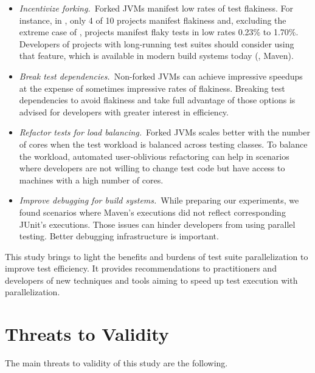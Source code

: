 \documentclass[10pt,journal,compsoc]{IEEEtran}
\begin{document}
\begin{itemize}
\item \emph{Incentivize forking.}~Forked JVMs manifest low rates of
  test flakiness.  For instance, in \emph{\ForkSeq{}}, only 4 of 10
  projects manifest flakiness and, excluding the extreme case of
  , projects manifest flaky tests in low rates 0.23\%
  to 1.70\%.  Developers of projects with long-running test suites
  should consider using that feature, which is available in modern
  build systems today (\eg{}, Maven).
\item \emph{Break test dependencies.}~Non-forked JVMs can achieve
  impressive speedups at the expense of sometimes impressive rates of
  flakiness.  Breaking test dependencies to avoid flakiness and take
  full advantage of those options is advised for developers with
  greater interest in efficiency.
\item \emph{Refactor tests for load balancing.}~Forked JVMs scales
  better with the number of cores when the test workload is balanced
  across testing classes.  To balance the workload, automated
  user-oblivious refactoring can help in scenarios where developers
  are not willing to change test code but have access to machines with
  a high number of cores.
\item \emph{Improve debugging for build systems.}~While preparing our
  experiments, we found scenarios where Maven's executions did not reflect
  corresponding JUnit's executions.  Those issues can hinder developers from using parallel
  testing. Better debugging infrastructure is important.
\end{itemize}

This study brings to light the benefits and burdens of test suite
parallelization to improve test efficiency. It provides
recommendations to practitioners and developers of new techniques and
tools aiming to speed up test execution with parallelization.


\section{Threats to Validity}

The main threats to validity of this study are the following.
\end{document}
